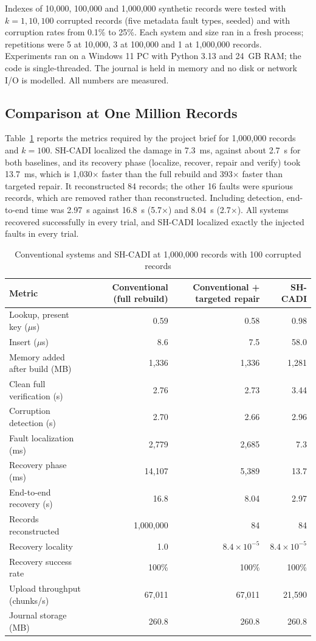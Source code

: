 \documentclass[conference]{IEEEtran}
\begin{document}
Indexes of 10,000, 100,000 and 1,000,000 synthetic records were tested with $k = 1, 10, 100$ corrupted records (five metadata fault types, seeded) and with corruption rates from 0.1\% to 25\%. Each system and size ran in a fresh process; repetitions were 5 at 10,000, 3 at 100,000 and 1 at 1,000,000 records. Experiments ran on a Windows 11 PC with Python 3.13 and 24~GB RAM; the code is single-threaded. The journal is held in memory and no disk or network I/O is modelled. All numbers are measured.

\subsection{Comparison at One Million Records}

Table~\ref{tab:main} reports the metrics required by the project brief for 1,000,000 records and $k = 100$. SH-CADI localized the damage in 7.3~ms, against about 2.7~s for both baselines, and its recovery phase (localize, recover, repair and verify) took 13.7~ms, which is 1,030$\times$ faster than the full rebuild and 393$\times$ faster than targeted repair. It reconstructed 84 records; the other 16 faults were spurious records, which are removed rather than reconstructed. Including detection, end-to-end time was 2.97~s against 16.8~s (5.7$\times$) and 8.04~s (2.7$\times$). All systems recovered successfully in every trial, and SH-CADI localized exactly the injected faults in every trial.

\begin{table}[t]
\centering
\caption{Conventional systems and SH-CADI at 1,000,000 records with 100 corrupted records}
\label{tab:main}
\small
\begin{tabular}{@{}lrrr@{}}
\toprule
Metric & Conventional (full rebuild) & Conventional + targeted repair & SH-CADI \\
\midrule
Lookup, present key ($\mu$s) & 0.59 & 0.58 & 0.98 \\
Insert ($\mu$s) & 8.6 & 7.5 & 58.0 \\
Memory added after build (MB) & 1,336 & 1,336 & 1,281 \\
Clean full verification (s) & 2.76 & 2.73 & 3.44 \\
Corruption detection (s) & 2.70 & 2.66 & 2.96 \\
Fault localization (ms) & 2,779 & 2,685 & 7.3 \\
Recovery phase (ms) & 14,107 & 5,389 & 13.7 \\
End-to-end recovery (s) & 16.8 & 8.04 & 2.97 \\
Records reconstructed & 1,000,000 & 84 & 84 \\
Recovery locality & 1.0 & $8.4 \times 10^{-5}$ & $8.4 \times 10^{-5}$ \\
Recovery success rate & 100\% & 100\% & 100\% \\
Upload throughput (chunks/s) & 67,011 & 67,011 & 21,590 \\
Journal storage (MB) & 260.8 & 260.8 & 260.8 \\
\bottomrule
\end{tabular}
\end{table}
\end{document}
